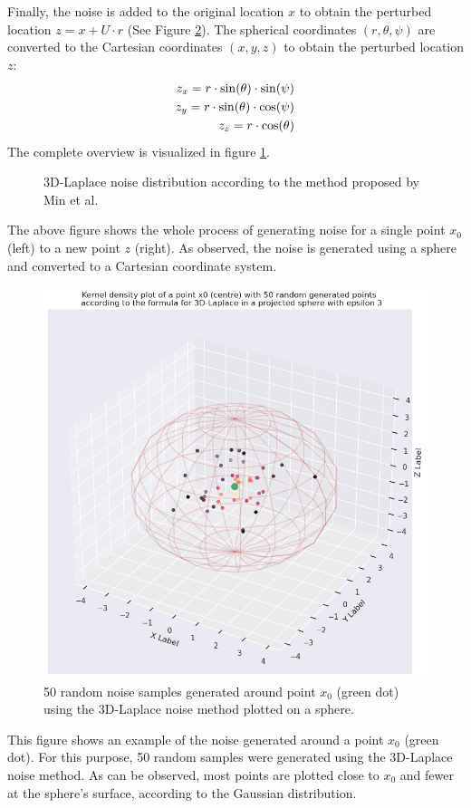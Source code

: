 Finally, the noise is added to the original location $x$ to obtain the perturbed location $z = x + U \cdot r$ (See Figure \ref{fig:3d-laplace-noise}).
The spherical coordinates $(r, \theta, \psi)$ are converted to the Cartesian coordinates $(x, y, z)$ to obtain the perturbed location $z$:
\begin{align}
  z_x = r \cdot \sin(\theta) \cdot \sin(\psi) \notag \\
  z_y = r \cdot \sin(\theta) \cdot \cos(\psi) \notag \\
  z_z = r \cdot \cos(\theta) 
  \label{eq:3d-cartesian}
\end{align}
The complete overview is visualized in figure \ref{fig:3d-laplace}.
\begin{figure}[H]
  
  \caption{3D-Laplace noise distribution according to the method proposed by Min et al. \citep{9646489}}
  \label{fig:3d-laplace}
\end{figure}
The above figure shows the whole process of generating noise for a single point $x_0$ (left) to a new point $z$ (right).
As observed, the noise is generated using a sphere and converted to a Cartesian coordinate system.
\newpage
\begin{figure}[H]
  \includegraphics[width=1\textwidth]{TheorethicalFramework/ND-Laplace/Images/3d_laplace_noise.png}
  \caption{50 random noise samples generated around point $x_0$ (green dot) using the 3D-Laplace noise method \citep{9646489} plotted on a sphere.}
  \label{fig:3d-laplace-noise}
\end{figure}
This figure shows an example of the noise generated around a point $x_0$ (green dot).
For this purpose, 50 random samples were generated using the 3D-Laplace noise method.
As can be observed, most points are plotted close to $x_0$ and fewer at the sphere's surface, according to the Gaussian distribution.

